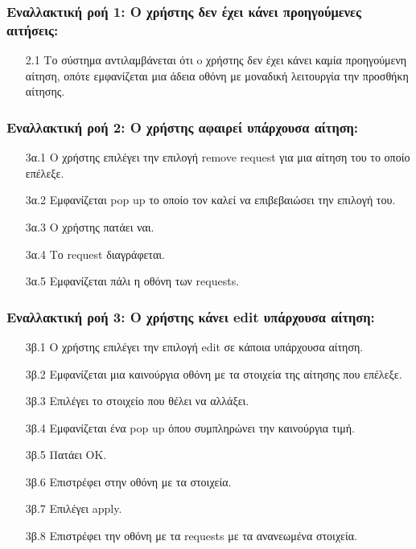 \documentclass[12pt,a4paper]{article}
\begin{document}
\subsubsection*{Εναλλακτική ροή 1: Ο χρήστης δεν έχει κάνει προηγούμενες αιτήσεις:}
\begin{enumerate}
    \item [2.1] Το σύστημα αντιλαμβάνεται ότι o χρήστης δεν έχει κάνει καμία προηγούμενη αίτηση, οπότε εμφανίζεται μια άδεια οθόνη με μοναδική λειτουργία την προσθήκη αίτησης.
\end{enumerate}

\subsubsection*{Εναλλακτική ροή 2: Ο χρήστης αφαιρεί υπάρχουσα αίτηση:}
\begin{enumerate}
    \item [3α.1] Ο χρήστης επιλέγει την επιλογή remove request για μια αίτηση του το οποίο επέλεξε.
    \item [3α.2] Εμφανίζεται pop up το οποίο τον καλεί να επιβεβαιώσει την επιλογή του.
    \item [3α.3] Ο χρήστης πατάει ναι.
    \item [3α.4] Το request διαγράφεται.
    \item [3α.5] Εμφανίζεται πάλι η οθόνη των requests.
\end{enumerate}

\subsubsection*{Εναλλακτική ροή 3: Ο χρήστης κάνει edit υπάρχουσα αίτηση:}
\begin{enumerate}
    \item [3β.1] Ο χρήστης επιλέγει την επιλογή edit σε κάποια υπάρχουσα αίτηση.
    \item [3β.2] Εμφανίζεται μια καινούργια οθόνη με τα στοιχεία της αίτησης που επέλεξε.
    \item [3β.3] Επιλέγει το στοιχείο που θέλει να αλλάξει.
    \item [3β.4] Εμφανίζεται ένα pop up όπου συμπληρώνει την καινούργια τιμή.
    \item [3β.5] Πατάει OK.
    \item [3β.6] Επιστρέφει στην οθόνη με τα στοιχεία.
    \item [3β.7] Επιλέγει apply.
    \item [3β.8] Επιστρέφει την οθόνη με τα requests με τα ανανεωμένα στοιχεία.
\end{enumerate}
\end{document}
